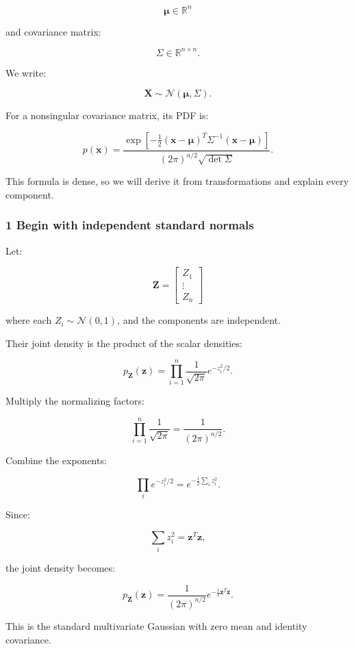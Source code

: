 \[
 \boldsymbol\mu\in\mathbb R^n
\]

and covariance matrix:

\[
 \Sigma\in\mathbb R^{n\times n}.
\]

We write:

\[
 \boxed{ \mathbf X\sim\mathcal N(\boldsymbol\mu,\Sigma) }.
\]

For a nonsingular covariance matrix, its PDF is:

\[
 \boxed{ p(\mathbf x)= \frac{ \exp\left[ -\frac12(\mathbf x-\boldsymbol\mu)^T \Sigma^{-1} (\mathbf x-\boldsymbol\mu) \right] }{ (2\pi)^{n/2}\sqrt{\det\Sigma} } }.
\]

This formula is dense, so we will derive it from transformations and explain every component.

\subsubsection{1 Begin with independent standard normals}\label{02-foundations-ii-ch024-begin-with-independent-standard-normals}

Let:

\[
 \mathbf Z= \begin{bmatrix} Z_1\\ \vdots\\ Z_n \end{bmatrix}
\]

where each \(Z_i\sim\mathcal N(0,1)\), and the components are independent.

Their joint density is the product of the scalar densities:

\[
 p_{\mathbf Z}(\mathbf z)= \prod_{i=1}^{n} \frac1{\sqrt{2\pi}}e^{-z_i^2/2}.
\]

Multiply the normalizing factors:

\[
 \prod_{i=1}^{n}\frac1{\sqrt{2\pi}} = \frac1{(2\pi)^{n/2}}.
\]

Combine the exponents:

\[
 \prod_i e^{-z_i^2/2} = e^{-\frac12\sum_i z_i^2}.
\]

Since:

\[
 \sum_i z_i^2=\mathbf z^T\mathbf z,
\]

the joint density becomes:

\[
 \boxed{ p_{\mathbf Z}(\mathbf z)= \frac1{(2\pi)^{n/2}} e^{-\frac12\mathbf z^T\mathbf z} }.
\]

This is the standard multivariate Gaussian with zero mean and identity covariance.

